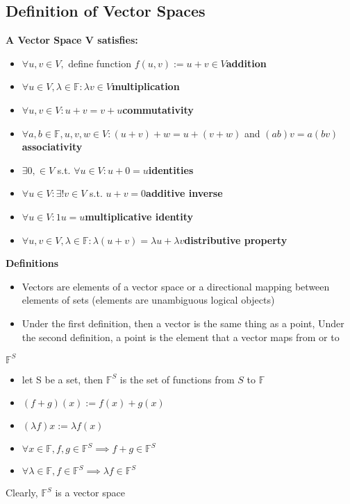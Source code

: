 \documentclass{article}
\newcommand{\0}{{\bf{0}}}
\begin{document}
\subsection{Definition of Vector Spaces}
{\textbf{A Vector Space V satisfies:}}
\begin{itemize}
    \item $\forall{}u,v\in{}V,$ define function $f(u,v):=u+v\in{}V$\null\hfill{\textbf{addition}}
    \item $\forall{}u\in{}V,\lambda\in\mathbb{F}:\lambda{}v\in{}V$\null\hfill{\textbf{multiplication}}
    \item $\forall{}u,v\in{}V:u+v=v+u$\null\hfill{\textbf{commutativity}}
    \item $\forall{}a,b\in\mathbb{F},u,v,w\in{}V:(u+v)+w=u+(v+w)$ and $(ab)v=a(bv)$\null\hfill{\textbf{associativity}}
    \item $\exists0,\in{}V$ s.t. $\forall{}u\in{}V:u+0=u$\null\hfill{\textbf{identities}}
    \item $\forall{}u\in{}V:\exists!v\in{}V$ s.t. $u+v=0$\null\hfill{\textbf{additive inverse}}
    \item $\forall{}u\in{}V:1u=u$\null\hfill{\textbf{multiplicative identity}}
    \item $\forall{}u,v\in{}V,\lambda\in\mathbb{F}:\lambda(u+v)=\lambda{}u+\lambda{}v$\null\hfill{\textbf{distributive property}}
\end{itemize}
{\textbf{Definitions}}
\begin{itemize}
    \item Vectors are elements of a vector space or a directional mapping between elements of sets (elements are unambiguous logical objects)
    \item Under the first definition, then a vector is the same thing as a point, Under the second definition, a point is the element that a vector maps from or to
\end{itemize}
{\textbf{$\mathbb{F}^S$}}
\begin{itemize}
    \item let S be a set, then $\mathbb{F}^S$ is the set of functions from $S$ to $\mathbb{F}$
    \item $(f+g)(x):=f(x)+g(x)$
    \item $(\lambda f)x:=\lambda{}f(x)$
    \item $\forall{}x\in\mathbb{F},f,g\in\mathbb{F}^S\implies{}f+g\in\mathbb{F}^S$
    \item $\forall{}\lambda\in\mathbb{F},f\in\mathbb{F}^S\implies{}\lambda{}f\in\mathbb{F}^S$
\end{itemize}
Clearly, $\mathbb{F}^S$ is a vector space
\end{document}
